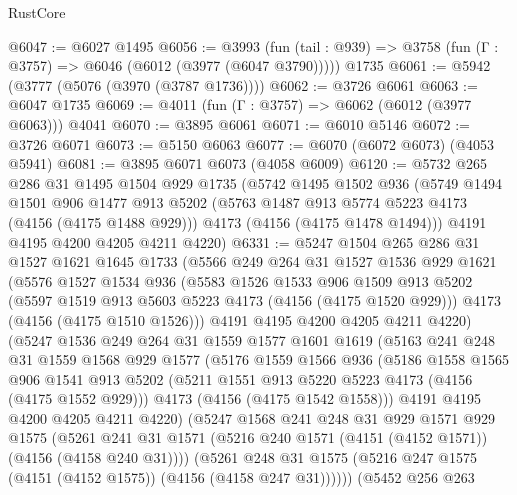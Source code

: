 \begin{lexlean}{RustCore}
\begin{coremodule}
@6047 := @6027 @1495
@6056 := @3993
    (fun (tail : @939) => @3758 (fun (Γ : @3757) => @6046 (@6012 (@3977 (@6047 @3790)))))
    @1735
@6061 := @5942 (@3777 (@5076 (@3970 (@3787 @1736))))
@6062 := @3726 @6061
@6063 := @6047 @1735
@6069 := @4011 (fun (Γ : @3757) => @6062 (@6012 (@3977 @6063))) @4041
@6070 := @3895 @6061
@6071 := @6010 @5146
@6072 := @3726 @6071
@6073 := @5150 @6063
@6077 := @6070 (@6072 @6073) (@4053 @5941)
@6081 := @3895 @6071 @6073 (@4058 @6009)
@6120 := @5732
    @265
    @286
    @31
    @1495
    @1504
    @929
    @1735
    (@5742
      @1495
      @1502
      @936
      (@5749
        @1494
        @1501
        @906
        @1477
        @913
        @5202
        (@5763 @1487 @913 @5774 @5223 @4173 (@4156 (@4175 @1488 @929)))
        @4173
        (@4156 (@4175 @1478 @1494)))
      @4191
      @4195
      @4200
      @4205
      @4211
      @4220)
@6331 := @5247
    @1504
    @265
    @286
    @31
    @1527
    @1621
    @1645
    @1733
    (@5566
      @249
      @264
      @31
      @1527
      @1536
      @929
      @1621
      (@5576
        @1527
        @1534
        @936
        (@5583
          @1526
          @1533
          @906
          @1509
          @913
          @5202
          (@5597 @1519 @913 @5603 @5223 @4173 (@4156 (@4175 @1520 @929)))
          @4173
          (@4156 (@4175 @1510 @1526)))
        @4191
        @4195
        @4200
        @4205
        @4211
        @4220)
      (@5247
        @1536
        @249
        @264
        @31
        @1559
        @1577
        @1601
        @1619
        (@5163
          @241
          @248
          @31
          @1559
          @1568
          @929
          @1577
          (@5176
            @1559
            @1566
            @936
            (@5186
              @1558
              @1565
              @906
              @1541
              @913
              @5202
              (@5211 @1551 @913 @5220 @5223 @4173 (@4156 (@4175 @1552 @929)))
              @4173
              (@4156 (@4175 @1542 @1558)))
            @4191
            @4195
            @4200
            @4205
            @4211
            @4220)
          (@5247
            @1568
            @241
            @248
            @31
            @929
            @1571
            @929
            @1575
            (@5261 @241 @31 @1571 (@5216 @240 @1571 (@4151 (@4152 @1571)) (@4156 (@4158 @240 @31))))
            (@5261
              @248
              @31
              @1575
              (@5216 @247 @1575 (@4151 (@4152 @1575)) (@4156 (@4158 @247 @31))))))
        (@5452
          @256
          @263

\end{coremodule}
\end{lexlean}
